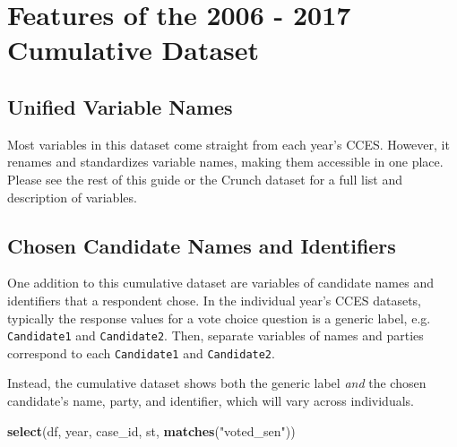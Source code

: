 \documentclass[10pt,article,oneside]{memoir}
\theoremstyle{definition}
\newenvironment{Shaded}{\begin{snugshade}}{\end{snugshade}}
\newcommand{\KeywordTok}[1]{\textcolor[rgb]{0.13,0.29,0.53}{\textbf{#1}}}
\newcommand{\NormalTok}[1]{#1}
\newcommand{\StringTok}[1]{\textcolor[rgb]{0.31,0.60,0.02}{#1}}
\begin{document}
\newpage

\hypertarget{features-of-the-2006---2017-cumulative-dataset}{%
\section{Features of the 2006 - 2017 Cumulative
Dataset}\label{features-of-the-2006---2017-cumulative-dataset}}

\hypertarget{unified-variable-names}{%
\subsection{Unified Variable Names}\label{unified-variable-names}}

Most variables in this dataset come straight from each year's CCES.
However, it renames and standardizes variable names, making them
accessible in one place. Please see the rest of this guide or the Crunch
dataset for a full list and description of variables.

\hypertarget{chosen-candidate-names-and-identifiers}{%
\subsection{Chosen Candidate Names and
Identifiers}\label{chosen-candidate-names-and-identifiers}}

One addition to this cumulative dataset are variables of candidate names
and identifiers that a respondent chose. In the individual year's CCES
datasets, typically the response values for a vote choice question is a
generic label, e.g. \texttt{Candidate1} and \texttt{Candidate2}. Then,
separate variables of names and parties correspond to each
\texttt{Candidate1} and \texttt{Candidate2}.

Instead, the cumulative dataset shows both the generic label \emph{and}
the chosen candidate's name, party, and identifier, which will vary
across individuals.

\begin{Shaded}
\begin{Highlighting}[]
\KeywordTok{select}\NormalTok{(df, year, case_id, st, }\KeywordTok{matches}\NormalTok{(}\StringTok{"voted_sen"}\NormalTok{))}
\end{Highlighting}
\end{Shaded}
\end{document}
